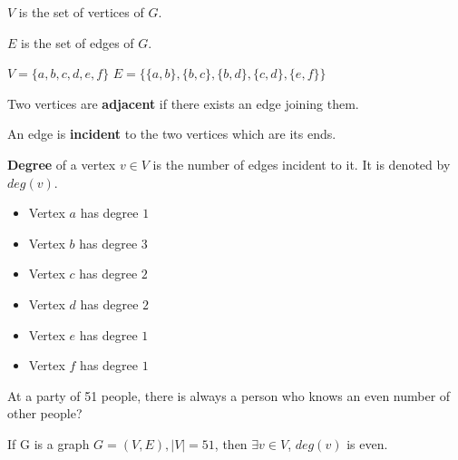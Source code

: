 \documentclass[9pt, letterpaper, oneside]{article}
\begin{document}
$V$ is the set of vertices of $G$.

$E$ is the set of edges of $G$.

$V = \{a, b, c, d, e, f\}$
$E = \{\{a, b\}, \{b, c\}, \{b, d\}, \{c, d\}, \{e, f\}\}$

Two vertices are \textbf{adjacent} if there exists an edge joining them.

An edge is \textbf{incident} to the two vertices which are its ends. 

\textbf{Degree} of a vertex $v \in V$ is the number of edges incident to it. It is denoted by $deg(v)$. 

\begin{figure}[h]
\centering
{}
\end{figure}

\begin{itemize}
\item Vertex $a$ has degree $1$
\item Vertex $b$ has degree $3$
\item Vertex $c$ has degree $2$
\item Vertex $d$ has degree $2$
\item Vertex $e$ has degree $1$
\item Vertex $f$ has degree $1$
\end{itemize}

At a party of 51 people, there is always a person who knows an even number of other people?

If G is a graph $G = (V, E), |V| = 51$, then $\exists v \in V$, $deg(v)$ is even. 
\end{document}

